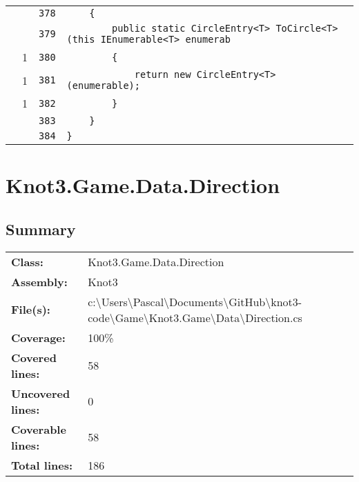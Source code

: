 \documentclass[a4paper,10pt]{article}
\begin{document}
\begin{longtable}[l]{lrrl}
\cellcolor{gray} &  & \verb~378~ & \verb~    {~\\
\cellcolor{gray} &  & \verb~379~ & \verb~        public static CircleEntry<T> ToCircle<T> (this IEnumerable<T> enumerab~\\
\cellcolor{green} & 1 & \verb~380~ & \verb~        {~\\
\cellcolor{green} & 1 & \verb~381~ & \verb~            return new CircleEntry<T> (enumerable);~\\
\cellcolor{green} & 1 & \verb~382~ & \verb~        }~\\
\cellcolor{gray} &  & \verb~383~ & \verb~    }~\\
\cellcolor{gray} &  & \verb~384~ & \verb~}~\\
\end{longtable}
\newpage
\section{Knot3.Game.Data.Direction}
\subsection{Summary}
\begin{longtable}[l]{ll}
\textbf{Class:} & Knot3.Game.Data.Direction\\
\textbf{Assembly:} & Knot3\\
\textbf{File(s):} & \begin{minipage}[t]{12cm}{c:\textbackslash Users\textbackslash Pascal\textbackslash Documents\textbackslash GitHub\textbackslash knot3-code\textbackslash Game\textbackslash Knot3.Game\textbackslash Data\textbackslash Direction.cs}\end{minipage} \\
\textbf{Coverage:} & 100\%\\
\textbf{Covered lines:} & 58\\
\textbf{Uncovered lines:} & 0\\
\textbf{Coverable lines:} & 58\\
\textbf{Total lines:} & 186\\
\end{longtable}
\end{document}
